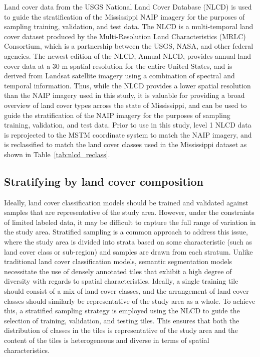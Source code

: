 Land cover data from the USGS National Land Cover Database (NLCD) is used to guide the stratification of the Mississippi NAIP imagery for the purposes of sampling training, validation, and test data.
The NLCD is a multi-temporal land cover dataset produced by the Multi-Resolution Land Characteristics (MRLC) Consortium, which is a partnership between the USGS, NASA, and other federal agencies.
The newest edition of the NLCD, Annual NLCD, provides annual land cover data at a 30 m spatial resolution for the entire United States, and is derived from Landsat satellite imagery using a combination of spectral and temporal information.
Thus, while the NLCD provides a lower spatial resolution than the NAIP imagery used in this study, it is valuable for providing a broad overview of land cover types across the state of Mississippi, and can be used to guide the stratification of the NAIP imagery for the purposes of sampling training, validation, and test data.
Prior to use in this study, level 1 NLCD data is reprojected to the MSTM coordinate system to match the NAIP imagery, and is reclassified to match the land cover classes used in the Mississippi dataset as shown in Table~\ref{tab:nlcd_reclass}.




\subsection{Stratifying by land cover composition}

Ideally, land cover classification models should be trained and validated against samples that are representative of the study area. 
However, under the constraints of limited labeled data, it may be difficult to capture the full range of variation in the study area. 
Stratified sampling is a common approach to address this issue, where the study area is divided into strata based on some characteristic (such as land cover class or sub-region) and samples are drawn from each stratum.
Unlike traditional land cover classification models, semantic segmentation models necessitate the use of densely annotated tiles that exhibit a high degree of diversity with regards to spatial characteristics.
Ideally, a single training tile should consist of a mix of land cover classes, and the arrangement of land cover classes should similarly be representative of the study area as a whole.
To achieve this, a stratified sampling strategy is employed using the NLCD to guide the selection of training, validation, and testing tiles.
This ensures that both the distribution of classes in the tiles is representative of the study area and the content of the tiles is heterogeneous and diverse in terms of spatial characteristics.

